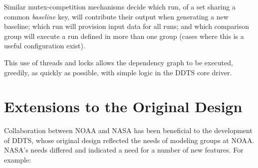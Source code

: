 \documentclass[conference]{IEEEtran}
\begin{document}
Similar mutex-competition mechanisms decide which run, of a set sharing a common \emph{baseline} key, will contribute their output when generating a new baseline; which run will provision input data for all runs; and which comparison group will execute a run defined in more than one group (cases where this is a useful configuration exist).

This use of threads and locks allows the dependency graph to be executed, greedily, as quickly as possible, with simple logic in the DDTS core driver.

\section{Extensions to the Original Design}

Collaboration between NOAA and NASA has been beneficial to the development of DDTS, whose original design reflected the needs of modeling groups at NOAA. NASA's needs differed and indicated a need for a number of new features. For example:
\end{document}
